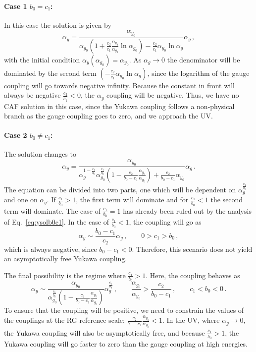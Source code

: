 \paragraph{Case 1 $b_0=c_1$:} In this case the solution is given by 
\begin{equation}
    \alpha_y=\frac{\alpha_{y_0}}{\alpha_{g_0}\left(1+\frac{c_2}{c_1}\frac{\alpha_{y_0}}{\alpha_{g_0}}\ln\alpha_{g_0}\right)-\frac{c_2}{c_1}\alpha_{y_0}\ln \alpha_g }\alpha_g\,,\label{eq:ysolb0c1}
\end{equation}
with the initial condition $\alpha_y(\alpha_{g_0})=\alpha_{y_{0}}$. As $\alpha_g\to0$ the denominator will be dominated by the second term  $(-\frac{c_2}{c_1}\alpha_{y_0}\ln \alpha_g) $, since the logarithm of the gauge coupling will go towards negative infinity. Because the constant in front will always be negative $\frac{c_2}{c_1}<0$, the $\alpha_y$ coupling will be negative. Thus, we have no CAF solution in this case, since the Yukawa coupling follows a non-physical branch as the gauge coupling goes to zero, and we approach the UV. 

\paragraph{Case 2 $b_0\neq c_1$:} The solution changes to
\begin{equation}
    \alpha_y=\frac{\alpha_{y_0}}{ \alpha_g^{1-\frac{c_1}{b_0}}\alpha_{g_0}^{\frac{c_1}{b_0}}\left(1-\frac{c_2}{b_0-c_1}\frac{\alpha_{y_0}}{\alpha_{g_0}}\right)+\frac{c_2}{b_0-c_1}\alpha_{y_0} }\alpha_g\,.\label{eq:sol2g}
\end{equation}
The equation can be divided into two parts, one which will be dependent on $\alpha^{\frac{c_1}{b_0}}_g$ and one on $\alpha_g$. If $\frac{c_1}{b_0}>1$, the first term will dominate and for $\frac{c_1}{b_0}<1$ the second term will dominate. The case of $\frac{c_1}{b_0}=1$ has already been ruled out by the analysis of Eq.~\eqref{eq:ysolb0c1}. In the case of $\frac{c_1}{b_0}<1$, the coupling will go as 
\begin{equation}
    \alpha_y\sim\frac{b_0-c_1}{c_2}\alpha_g\,,\quad\quad 0>{c_1}>b_0\,,
\end{equation}
which is always negative, since $b_0-c_1<0$. Therefore, this scenario does not yield an asymptotically free Yukawa coupling. 

The final possibility is the regime where $\frac{c_1}{b_0}>1$. Here, the coupling behaves as
\begin{equation}
    \alpha_y\sim\frac{\alpha_{y_0}}{ \alpha_{g_0}^{\frac{c_1}{b_0}}\left(1-\frac{c_2}{b_0-c_1}\frac{\alpha_{y_0}}{\alpha_{g_0}}\right)}\alpha_g^{\frac{c_1}{b_0}}\,,\quad\quad \frac{\alpha_{g_0}}{\alpha_{y_0}}>\frac{c_2}{b_0-c_1}\,,\quad\quad c_1<b_0<0\,.\label{eq:Yukawacondoff}
\end{equation}
To ensure that the coupling will be positive, we need to constrain the values of the couplings at the RG reference scale: $\frac{c_2}{b_0-c_1}\frac{\alpha_{y_0}}{\alpha_{g_0}}<1$. In the UV, where $\alpha_g\to 0$, the Yukawa coupling will also be asymptotically free, and because $\frac{c_1}{b_0}>1$, the Yukawa coupling will go faster to zero than the gauge coupling at high energies. 

